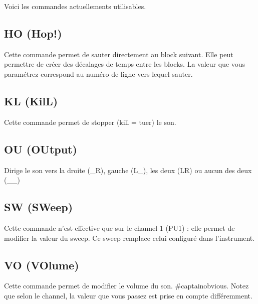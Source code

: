 
Voici les commandes actuellements utilisables.

\subsection{HO (Hop!)}

Cette commande permet de sauter directement au block suivant.
Elle peut permettre de créer des décalages de temps entre les blocks.
La valeur que vous paramétrez correspond au numéro de ligne vers lequel sauter.

\subsection{KL (KilL)}

Cette commande permet de stopper (kill = tuer) le son.


\subsection{OU (OUtput)}

Dirige le son vers la droite (\_R), gauche (L\_), les deux (LR) ou aucun des deux (\_\_)

\subsection{SW (SWeep)}

Cette commande n'est effective que sur le channel 1 (PU1) : elle permet de modifier la valeur du sweep.
Ce sweep remplace celui configuré dans l'instrument.

\subsection{VO (VOlume)}

Cette commande permet de modifier le volume du son.
\#captainobvious.
Notez que selon le channel, la valeur que vous passez est prise en compte différemment.
